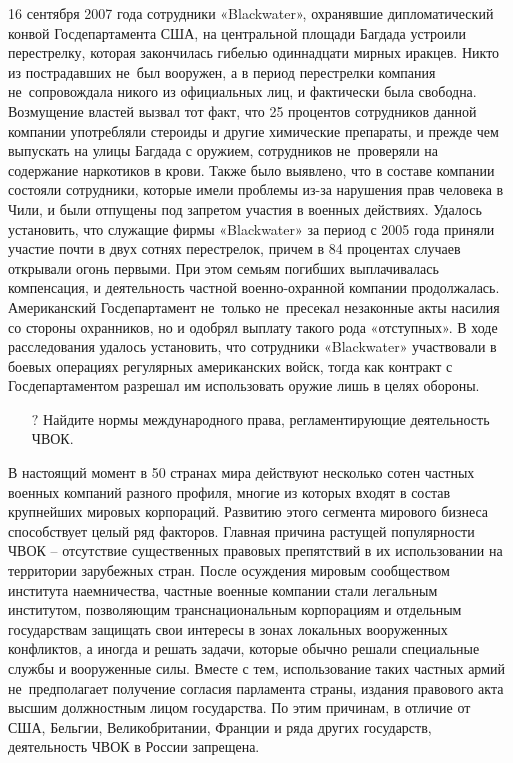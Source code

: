 \documentclass[a4paper,12pt,fleqn]{article} %
\begin{document}
\begin{tcolorbox}[colback=blue!55!red!5!,colframe=blue!55!red,enforce breakable,%
	pad at break=1mm, title=Кейс 33. Действия частной компании в зоне конфликта]
	
	
  16 сентября 2007 года сотрудники «Blackwater», охранявшие дипломатический конвой Госдепартамента США, на центральной площади Багдада устроили перестрелку, которая закончилась гибелью одиннадцати мирных иракцев. Никто из пострадавших не~был вооружен, а в период перестрелки компания не~сопровождала никого из официальных лиц, и фактически была свободна. Возмущение властей вызвал тот факт, что 25 процентов сотрудников  данной компании употребляли стероиды и другие химические препараты, и прежде чем выпускать на улицы Багдада с оружием, сотрудников не~проверяли на содержание наркотиков в крови. Также было выявлено, что в составе компании состояли сотрудники, которые имели проблемы из-за нарушения прав человека в Чили, и были отпущены под запретом участия в военных действиях. Удалось установить, что служащие фирмы «Blackwater» за период с 2005 года приняли участие почти в двух сотнях перестрелок, причем в 84 процентах случаев открывали огонь первыми. При этом семьям погибших выплачивалась компенсация, и деятельность частной военно-охранной компании продолжалась. Американский Госдепартамент не~только не~пресекал незаконные акты насилия со стороны охранников, но и одобрял выплату такого рода «отступных». В ходе расследования удалось установить, что сотрудники «Blackwater» участвовали в боевых операциях регулярных американских войск, тогда как контракт с Госдепартаментом разрешал им использовать оружие лишь в целях обороны.
	
	\begin{itemize}
		\item[{\color{blue!55!red}\Huge {  $ ? $}} \quad]   Найдите нормы международного права, регламентирующие деятельность ЧВОК.
	\end{itemize}	
	
\end{tcolorbox}

В настоящий момент в 50 странах мира действуют несколько сотен частных военных компаний разного профиля, многие из которых входят в состав крупнейших мировых корпораций. Развитию этого сегмента мирового бизнеса способствует целый ряд факторов. Главная причина растущей популярности ЧВОК – отсутствие существенных правовых препятствий в их использовании на территории зарубежных стран. После осуждения мировым сообществом института наемничества, частные военные компании стали легальным институтом, позволяющим транснациональным корпорациям и отдельным государствам защищать свои интересы в зонах локальных вооруженных конфликтов, а иногда и решать задачи, которые обычно решали специальные службы и вооруженные силы. Вместе с тем, использование таких частных армий не~предполагает получение согласия парламента страны, издания правового акта высшим должностным лицом государства. По этим причинам, в отличие от США, Бельгии, Великобритании, Франции и ряда других государств, деятельность ЧВОК в России запрещена.
\end{document}
